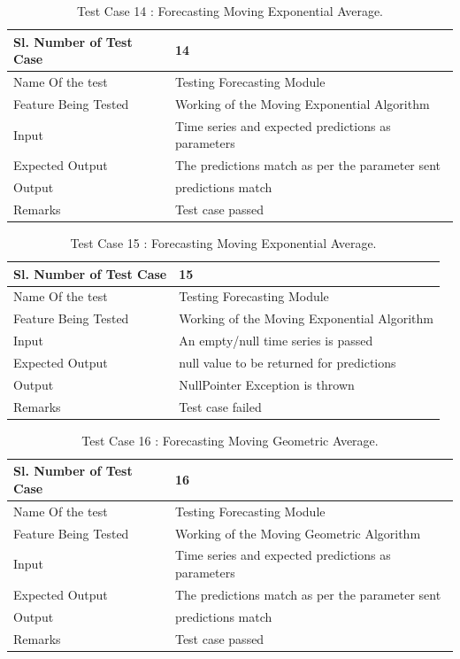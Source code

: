 \documentclass[12pt,a4paper]{report}
\begin{document}
\begin{table}
    \begin{tabular}{|l|l|}
    \hline
    Sl. Number of Test Case & 14                            \\ \hline
    Name Of the test        & Testing Forecasting Module     \\ \hline
    Feature Being Tested    & Working of the Moving Exponential Algorithm \\ \hline
    Input                   & Time series and expected predictions as parameters\\ \hline
    Expected Output         & The predictions match as per the parameter sent \\ \hline
    Output                  & predictions match \\ \hline
    Remarks                 & Test case passed              \\ \hline
    \end{tabular}
    \caption {Test Case 14 : Forecasting Moving Exponential Average.}
\end{table}
\begin{table}
    \begin{tabular}{|l|l|}
    \hline
    Sl. Number of Test Case & 15                            \\ \hline
    Name Of the test        & Testing Forecasting Module     \\ \hline
    Feature Being Tested    & Working of the Moving Exponential Algorithm \\ \hline
    Input                   & An empty/null time series is passed\\ \hline
    Expected Output         & null value to be returned for predictions \\ \hline
    Output                  & NullPointer Exception is thrown \\ \hline
    Remarks                 & Test case failed              \\ \hline
    \end{tabular}
    \caption {Test Case 15 : Forecasting Moving Exponential Average.}
\end{table}
\begin{table}
    \begin{tabular}{|l|l|}
    \hline
    Sl. Number of Test Case & 16                            \\ \hline
    Name Of the test        & Testing Forecasting Module     \\ \hline
    Feature Being Tested    & Working of the Moving Geometric Algorithm \\ \hline
    Input                   & Time series and expected predictions as parameters\\ \hline
    Expected Output         & The predictions match as per the parameter sent \\ \hline
    Output                  & predictions match \\ \hline
    Remarks                 & Test case passed              \\ \hline
    \end{tabular}
    \caption {Test Case 16 : Forecasting Moving Geometric Average.}
\end{table}
\end{document}
